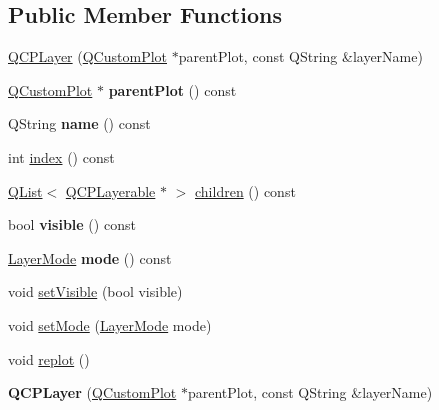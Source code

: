 \subsection*{Public Member Functions}
\begin{DoxyCompactItemize}
\item 
\hyperlink{class_q_c_p_layer_a5d0657fc86d624e5efbe930ef21af718}{Q\+C\+P\+Layer} (\hyperlink{class_q_custom_plot}{Q\+Custom\+Plot} $\ast$parent\+Plot, const Q\+String \&layer\+Name)
\item 
\hyperlink{class_q_custom_plot}{Q\+Custom\+Plot} $\ast$ {\bfseries parent\+Plot} () const \hypertarget{class_q_c_p_layer_a3958c9a938c2d05a7378c41484acee08}{}\label{class_q_c_p_layer_a3958c9a938c2d05a7378c41484acee08}

\item 
Q\+String {\bfseries name} () const \hypertarget{class_q_c_p_layer_a96ebd1e436f3813938cb9cd4a59a60be}{}\label{class_q_c_p_layer_a96ebd1e436f3813938cb9cd4a59a60be}

\item 
int \hyperlink{class_q_c_p_layer_ad5d7010829a6b99f326b07d7e37c8c99}{index} () const 
\item 
\hyperlink{class_q_list}{Q\+List}$<$ \hyperlink{class_q_c_p_layerable}{Q\+C\+P\+Layerable} $\ast$ $>$ \hyperlink{class_q_c_p_layer_a94c2f0100e48cefad2de8fe0fbb03c27}{children} () const 
\item 
bool {\bfseries visible} () const \hypertarget{class_q_c_p_layer_a9efca636e4dcad721999a6282f296016}{}\label{class_q_c_p_layer_a9efca636e4dcad721999a6282f296016}

\item 
\hyperlink{class_q_c_p_layer_a67dcfc1590be2a1f2227c5a39bb59c7c}{Layer\+Mode} {\bfseries mode} () const \hypertarget{class_q_c_p_layer_ae93755983003f89e5331bc91598a772e}{}\label{class_q_c_p_layer_ae93755983003f89e5331bc91598a772e}

\item 
void \hyperlink{class_q_c_p_layer_ac07671f74edf6884b51a82afb2c19516}{set\+Visible} (bool visible)
\item 
void \hyperlink{class_q_c_p_layer_a938d57b04f4e4c23cedf1711f983919b}{set\+Mode} (\hyperlink{class_q_c_p_layer_a67dcfc1590be2a1f2227c5a39bb59c7c}{Layer\+Mode} mode)
\item 
void \hyperlink{class_q_c_p_layer_adefd53b6db02f470151c416f42e37180}{replot} ()
\item 
{\bfseries Q\+C\+P\+Layer} (\hyperlink{class_q_custom_plot}{Q\+Custom\+Plot} $\ast$parent\+Plot, const Q\+String \&layer\+Name)\hypertarget{class_q_c_p_layer_a5d0657fc86d624e5efbe930ef21af718}{}\label{class_q_c_p_layer_a5d0657fc86d624e5efbe930ef21af718}


\end{DoxyCompactItemize}

